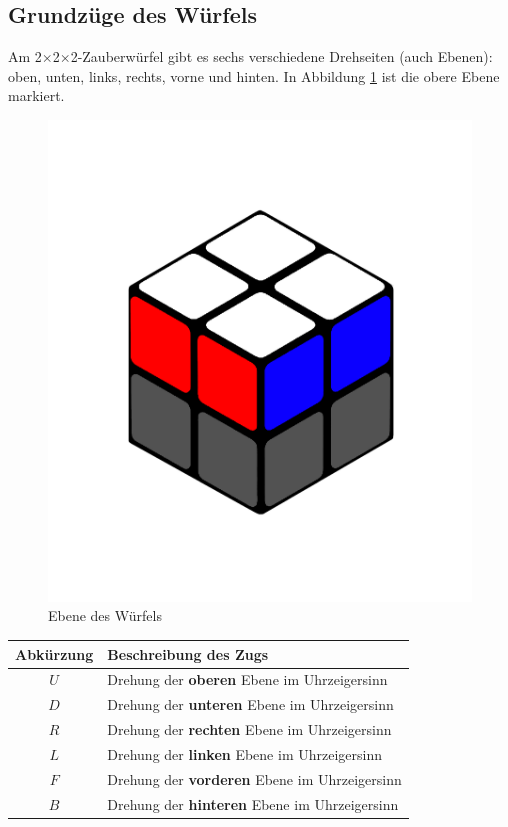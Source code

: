 \documentclass[12pt,a4paper, usenames, dvipsnames]{article}
\theoremstyle{mystyle}
\theoremstyle{definition}
\newcommand{\Ttwo}{2$\times$2$\times$2-}
\begin{document}
%
%
%
%
%
%
%
%
%
%
%
%
%


\subsection*{Grundzüge des Würfels} 
Am \Ttwo Zauberwürfel gibt es sechs verschiedene Drehseiten (auch Ebenen): oben, unten, links, rechts, vorne und hinten. 
In Abbildung \ref{24} ist die obere Ebene markiert.

\begin{figure}[H]
\centering
\includegraphics[scale=0.1]{ebene.png}
\caption[Ebene des Würfels]{Ebene des Würfels}
\label{24}
\end{figure}

\begin{center}
\begin{tabular}{cl}
\toprule
\textbf{Abkürzung} & \textbf{Beschreibung des Zugs} \\
\midrule
$U$ & Drehung der \textbf{oberen} Ebene im Uhrzeigersinn \\
$D$ & Drehung der \textbf{unteren} Ebene im Uhrzeigersinn \\
$R$ & Drehung der \textbf{rechten} Ebene im Uhrzeigersinn \\
$L$ & Drehung der \textbf{linken} Ebene im Uhrzeigersinn \\
$F$ & Drehung der \textbf{vorderen} Ebene im Uhrzeigersinn \\
$B$ & Drehung der \textbf{hinteren} Ebene im Uhrzeigersinn \\
\bottomrule
\end{tabular} 
\end{center}
\end{document}
